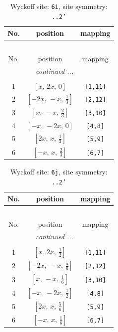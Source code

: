 \documentclass[fleqn,8pt]{jsarticle}
\begin{document}
\renewcommand{\arraystretch}{1.2}
\begin{longtable}{ccc}
\caption{Wyckoff site: {\tt 6i}, site symmetry: {\tt ..2'}}
 \\
 \hline \hline
No. & position & mapping \\ \hline \endfirsthead

\multicolumn{2}{l}{\tablename\ \thetable{}} \\
 \hline \hline
No. & position & mapping \\ \hline \endhead

 \hline \hline
\multicolumn{2}{r}{\footnotesize\it continued ...} \\ \endfoot

 \hline \hline
\multicolumn{2}{r}{} \\ \endlastfoot

1 & $\left[ x,\, 2 x,\, 0 \right]$ & {\tt [1,11]} \\ \hline
2 & $\left[ - 2 x,\, - x,\, \frac{1}{3} \right]$ & {\tt [2,12]} \\ \hline
3 & $\left[ x,\, - x,\, \frac{2}{3} \right]$ & {\tt [3,10]} \\ \hline
4 & $\left[ - x,\, - 2 x,\, 0 \right]$ & {\tt [4,8]} \\ \hline
5 & $\left[ 2 x,\, x,\, \frac{1}{3} \right]$ & {\tt [5,9]} \\ \hline
6 & $\left[ - x,\, x,\, \frac{2}{3} \right]$ & {\tt [6,7]} \\
\end{longtable}
\renewcommand{\arraystretch}{1.2}
\begin{longtable}{ccc}
\caption{Wyckoff site: {\tt 6j}, site symmetry: {\tt ..2'}}
 \\
 \hline \hline
No. & position & mapping \\ \hline \endfirsthead

\multicolumn{2}{l}{\tablename\ \thetable{}} \\
 \hline \hline
No. & position & mapping \\ \hline \endhead

 \hline \hline
\multicolumn{2}{r}{\footnotesize\it continued ...} \\ \endfoot

 \hline \hline
\multicolumn{2}{r}{} \\ \endlastfoot

1 & $\left[ x,\, 2 x,\, \frac{1}{2} \right]$ & {\tt [1,11]} \\ \hline
2 & $\left[ - 2 x,\, - x,\, \frac{5}{6} \right]$ & {\tt [2,12]} \\ \hline
3 & $\left[ x,\, - x,\, \frac{1}{6} \right]$ & {\tt [3,10]} \\ \hline
4 & $\left[ - x,\, - 2 x,\, \frac{1}{2} \right]$ & {\tt [4,8]} \\ \hline
5 & $\left[ 2 x,\, x,\, \frac{5}{6} \right]$ & {\tt [5,9]} \\ \hline
6 & $\left[ - x,\, x,\, \frac{1}{6} \right]$ & {\tt [6,7]} \\
\end{longtable}
\end{document}
